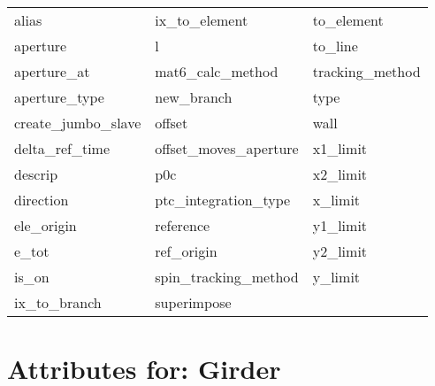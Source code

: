  \begin{tabular}{lll} \toprule
alias                       & ix_to_element               & to_element                  \\
aperture                    & l                           & to_line                     \\
aperture_at                 & mat6_calc_method            & tracking_method             \\
aperture_type               & new_branch                  & type                        \\
create_jumbo_slave          & offset                      & wall                        \\
delta_ref_time              & offset_moves_aperture       & x1_limit                    \\
descrip                     & p0c                         & x2_limit                    \\
direction                   & ptc_integration_type        & x_limit                     \\
ele_origin                  & reference                   & y1_limit                    \\
e_tot                       & ref_origin                  & y2_limit                    \\
is_on                       & spin_tracking_method        & y_limit                     \\
ix_to_branch                & superimpose                 &                             \\
 \bottomrule
 \end{tabular}
 \vfill
 
 \section{Attributes for: Girder}
 \label{s:list.girder}
 
